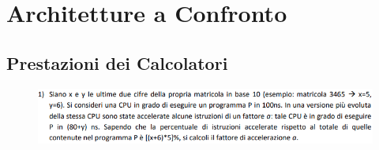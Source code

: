 
\section{Architetture a Confronto}

\subsection{Prestazioni dei Calcolatori}

\begin{figure}[h]%
	\centering
	\qquad
	\label{fig:mips}%
\end{figure}

\begin{figure}[h]%
	\centering
	\label{fig:prestazione}
	\qquad
	\label{fig:leggediamdhal}%
\end{figure}



\newpage 

\begin{figure}[ht]
	\includegraphics[width=1\linewidth]{es1_MiglioramentoPrestazioneMemoria}
	\label{fig:es1MiglioramentoPrestazioneMemoria}
\end{figure}

